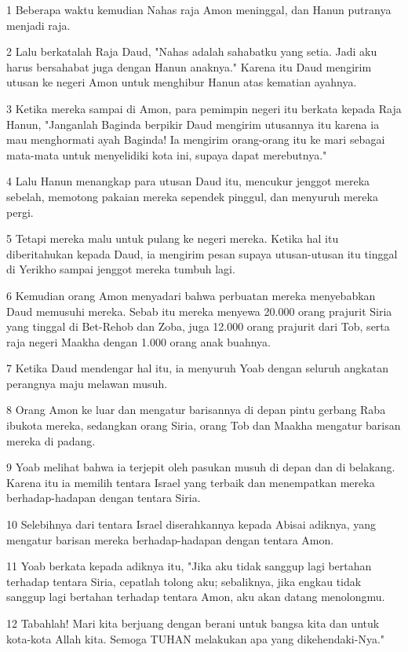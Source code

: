 \par 1 Beberapa waktu kemudian Nahas raja Amon meninggal, dan Hanun putranya menjadi raja.
\par 2 Lalu berkatalah Raja Daud, "Nahas adalah sahabatku yang setia. Jadi aku harus bersahabat juga dengan Hanun anaknya." Karena itu Daud mengirim utusan ke negeri Amon untuk menghibur Hanun atas kematian ayahnya.
\par 3 Ketika mereka sampai di Amon, para pemimpin negeri itu berkata kepada Raja Hanun, "Janganlah Baginda berpikir Daud mengirim utusannya itu karena ia mau menghormati ayah Baginda! Ia mengirim orang-orang itu ke mari sebagai mata-mata untuk menyelidiki kota ini, supaya dapat merebutnya."
\par 4 Lalu Hanun menangkap para utusan Daud itu, mencukur jenggot mereka sebelah, memotong pakaian mereka sependek pinggul, dan menyuruh mereka pergi.
\par 5 Tetapi mereka malu untuk pulang ke negeri mereka. Ketika hal itu diberitahukan kepada Daud, ia mengirim pesan supaya utusan-utusan itu tinggal di Yerikho sampai jenggot mereka tumbuh lagi.
\par 6 Kemudian orang Amon menyadari bahwa perbuatan mereka menyebabkan Daud memusuhi mereka. Sebab itu mereka menyewa 20.000 orang prajurit Siria yang tinggal di Bet-Rehob dan Zoba, juga 12.000 orang prajurit dari Tob, serta raja negeri Maakha dengan 1.000 orang anak buahnya.
\par 7 Ketika Daud mendengar hal itu, ia menyuruh Yoab dengan seluruh angkatan perangnya maju melawan musuh.
\par 8 Orang Amon ke luar dan mengatur barisannya di depan pintu gerbang Raba ibukota mereka, sedangkan orang Siria, orang Tob dan Maakha mengatur barisan mereka di padang.
\par 9 Yoab melihat bahwa ia terjepit oleh pasukan musuh di depan dan di belakang. Karena itu ia memilih tentara Israel yang terbaik dan menempatkan mereka berhadap-hadapan dengan tentara Siria.
\par 10 Selebihnya dari tentara Israel diserahkannya kepada Abisai adiknya, yang mengatur barisan mereka berhadap-hadapan dengan tentara Amon.
\par 11 Yoab berkata kepada adiknya itu, "Jika aku tidak sanggup lagi bertahan terhadap tentara Siria, cepatlah tolong aku; sebaliknya, jika engkau tidak sanggup lagi bertahan terhadap tentara Amon, aku akan datang menolongmu.
\par 12 Tabahlah! Mari kita berjuang dengan berani untuk bangsa kita dan untuk kota-kota Allah kita. Semoga TUHAN melakukan apa yang dikehendaki-Nya."
